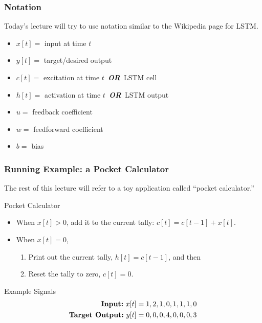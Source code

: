 \documentclass{beamer}
\begin{document}
\begin{frame}
  \frametitle{Notation}

  Today's lecture will try to use notation similar to the Wikipedia
  page for LSTM.
  \begin{itemize}
  \item $x[t]=$ input at time $t$
  \item $y[t]=$ target/desired output
  \item $c[t]=$ excitation at time $t$~{\bf\em OR}~LSTM cell
  \item $h[t]=$ activation at time $t$~{\bf\em OR}~LSTM output
  \item $u=$ feedback coefficient
  \item $w=$ feedforward coefficient
  \item $b=$ bias
  \end{itemize}
\end{frame}

\begin{frame}
  \frametitle{Running Example: a Pocket Calculator} The rest of this
  lecture will refer to a toy application called ``pocket calculator.''
  \begin{block}{Pocket Calculator}
    \begin{itemize}
    \item When $x[t]>0$, add it to the current tally: $c[t]=c[t-1]+x[t]$.
    \item When $x[t]=0$,
      \begin{enumerate}
      \item Print out the current tally, $h[t]=c[t-1]$, and then
      \item Reset the tally to zero, $c[t]=0$.
      \end{enumerate}
    \end{itemize}
  \end{block}
  \begin{block}{Example Signals}
    \begin{align*}
      \mbox{\bf Input:}~x[t] &= 1,2,1,0,1,1,1,0\\
      \mbox{\bf Target Output:}~y[t] &= 0,0,0,4,0,0,0,3
    \end{align*}
  \end{block}
\end{frame}
\end{document}
